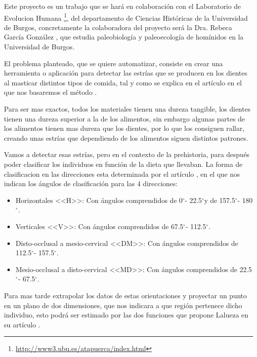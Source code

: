 \newcommand{\grad}{$^{\circ}$}
Este proyecto es un trabajo que se hará en colaboración con el Laboratorio de Evolucion Humana \footnote{ \url{http://www3.ubu.es/atapuerca/index.html}}, del departamento de Ciencias Históricas de la Universidad de Burgos, concretamente la colaboradora del proyecto será la Dra. Rebeca García González \cite{ubu:Rebe},  que estudia paleobiología y paleoecología de homínidos en la Universidad de Burgos. 

El problema planteado, que se quiere automatizar, consiste en crear una herramienta o aplicación para detectar las estrías que se producen en los dientes al masticar distintos tipos de comida, tal y como se explica en el artículo en el que nos basaremos el método \cite{garcia2015dietary}.

Para ser mas exactos, todos los materiales tienen una dureza tangible, los dientes tienen una dureza superior a la de los alimentos, sin embargo  algunas partes de los alimentos tienen mas dureza que los dientes, por lo que los consiguen rallar, creando unas estrías que dependiendo de los alimentos siguen distintos patrones.

 
Vamos a detectar esas estrías, pero en el contexto de la prehistoria, para después poder clasificar los individuos en función de la dieta que llevaban. La forma de clasificacion en las direcciones esta determinada por el artículo \cite{garcia2015dietary}, en el que nos indican los ángulos de clasificación para las 4 direcciones:
\begin{itemize}
\item Horizontales <<H>>: Con ángulos comprendidos de 0\grad - 22.5\grad y de 157.5\grad - 180\grad.
\item Verticales <<V>>: Con ángulos comprendidos de 67.5\grad - 112.5\grad. 
\item Disto-occlusal a mesio-cervical <<DM>>: Con ángulos comprendidos de 112.5\grad - 157.5\grad.
\item Mesio-occlusal a disto-cervical <<MD>>: Con ángulos comprendidos de 22.5\grad - 67.5\grad.
\end{itemize}
Para mas tarde extrapolar los datos de estas orientaciones y proyectar un punto en un plano de dos dimensiones, que nos indicara a que región pertenece dicho individuo, esto podrá ser estimado por las dos funciones que propone Lalueza en su artículo \cite{Lalueza:perez}. 


